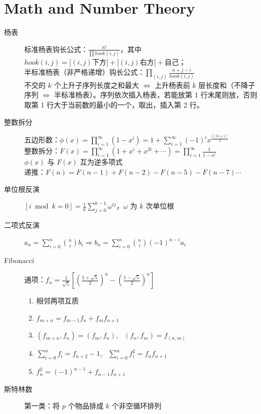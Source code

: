 \documentclass{article}
\begin{document}
\begin{multicols}{2}
\begin{lstlisting}
\end{lstlisting}


\section{Math and Number Theory}

\begin{description}
  \item[杨表] 标准杨表钩长公式：$\frac{n!}{\prod hook(i,j)}$，其中 $hook(i,j) = |(i,j)\text{下方}| + |(i,j)\text{右方}|+\text{自己}$；\\
      半标准杨表（非严格递增）钩长公式：$\prod_{(i,j)} \frac{n+j-i}{hook(i,j)}$ \\
      不交的 $k$ 个上升子序列长度之和最大 $\Leftrightarrow$ 上升杨表前 $k$ 层长度和（不降子序列 $\Leftrightarrow$ 半标准杨表）。序列依次插入杨表，若能放第 1 行末尾则放，否则取第 1 行大于当前数的最小的一个，取出，插入第 2 行。
  \item[整数拆分] 五边形数：$\phi(x) = \prod_{i=1}^{\infty} (1-x^i) = 1+ \sum_{i=1}^{\infty} (-1)^i x^{\frac{i(3i\pm 1)}{2}}$ \\
      整数拆分：$F(x) = \prod_{i=1}^{\infty} (1+x^i+x^{2i}+ \cdots) = \prod_{i=1}^{\infty} \frac{1}{1-x^i}$ \\
      $\phi(x)$ 与 $F(x)$ 互为逆多项式 \\
      递推：$F(n) = F(n-1) + F(n-2) - F(n-5) - F(n-7) \cdots$
  \item[单位根反演] $[i \bmod k = 0] = \frac{1}{k} \sum_{j=0}^{k-1} \omega^{ij}$，$\omega$ 为 $k$ 次单位根
  \item[二项式反演] $a_n = \sum_{i=0}^n \binom{n}{i} b_i \Rightarrow b_n = \sum_{i=0}^n \binom{n}{i} (-1)^{n-i} a_i$
  \item[Fibonacci] 通项：$f_n = \frac{1}{\sqrt 5} \left[ \left(\frac{1+\sqrt 5}{2}\right)^n - \left(\frac{1-\sqrt 5}{2}\right)^n \right]$
      \begin{enumerate}
        \item 相邻两项互质
        \item $f_{m+n} = f_{m-1} f_n + f_m f_{n+1}$
        \item $(f_{m+n}, f_n) = (f_m, f_n)$, \ $(f_n, f_m) = f_{(n,m)}$
        \item $\sum_{i=0}^n f_i = f_{n+2} -1$, \ $\sum_{i=0}^n f_i^2 = f_n f_{n+1}$
        \item $f_n^2 = (-1)^{n-1} + f_{n-1} f_{n+1}$
      \end{enumerate}
  \item[斯特林数] 第一类：将 $p$ 个物品排成 $k$ 个非空循环排列 \\

\end{description}
\end{multicols}
\end{document}
